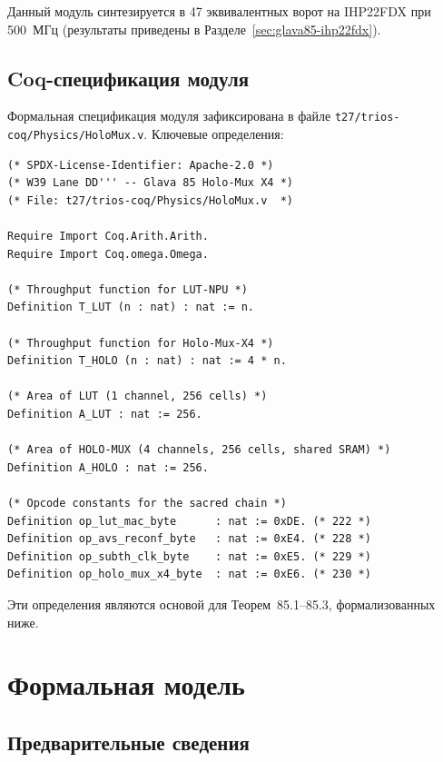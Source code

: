 Данный модуль синтезируется в 47 эквивалентных ворот на IHP22FDX
при 500~МГц (результаты приведены в Разделе~\ref{sec:glava85-ihp22fdx}).

\subsection{Coq-спецификация модуля}
\label{subsec:glava85-coq-spec}

Формальная спецификация модуля зафиксирована в файле
\texttt{t27/trios-coq/Physics/HoloMux.v}.
Ключевые определения:

\begin{lstlisting}[language=Coq, caption={Ключевые определения HoloMux.v},
  label=lst:holo-mux-coq-defs]
(* SPDX-License-Identifier: Apache-2.0 *)
(* W39 Lane DD''' -- Glava 85 Holo-Mux X4 *)
(* File: t27/trios-coq/Physics/HoloMux.v  *)

Require Import Coq.Arith.Arith.
Require Import Coq.omega.Omega.

(* Throughput function for LUT-NPU *)
Definition T_LUT (n : nat) : nat := n.

(* Throughput function for Holo-Mux-X4 *)
Definition T_HOLO (n : nat) : nat := 4 * n.

(* Area of LUT (1 channel, 256 cells) *)
Definition A_LUT : nat := 256.

(* Area of HOLO-MUX (4 channels, 256 cells, shared SRAM) *)
Definition A_HOLO : nat := 256.

(* Opcode constants for the sacred chain *)
Definition op_lut_mac_byte      : nat := 0xDE. (* 222 *)
Definition op_avs_reconf_byte   : nat := 0xE4. (* 228 *)
Definition op_subth_clk_byte    : nat := 0xE5. (* 229 *)
Definition op_holo_mux_x4_byte  : nat := 0xE6. (* 230 *)
\end{lstlisting}

Эти определения являются основой для Теорем~85.1--85.3,
формализованных ниже.

\section{Формальная модель}
\label{sec:glava85-formal-model}

\subsection{Предварительные сведения}
\label{subsec:glava85-preliminaries}

